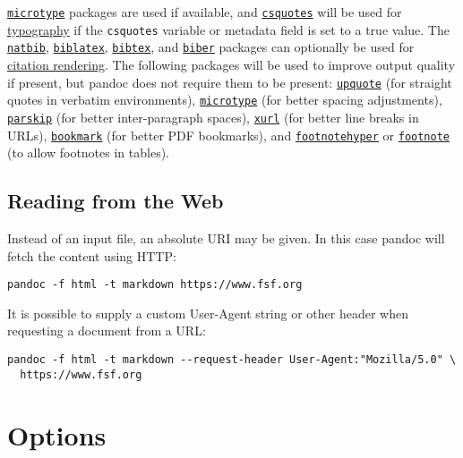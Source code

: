 \documentclass[
]{article}
\begin{document}
\href{https://ctan.org/pkg/microtype}{\texttt{microtype}} packages are
used if available, and
\href{https://ctan.org/pkg/csquotes}{\texttt{csquotes}} will be used for
\hyperref[typography]{typography} if the \texttt{csquotes} variable or
metadata field is set to a true value. The
\href{https://ctan.org/pkg/natbib}{\texttt{natbib}},
\href{https://ctan.org/pkg/biblatex}{\texttt{biblatex}},
\href{https://ctan.org/pkg/bibtex}{\texttt{bibtex}}, and
\href{https://ctan.org/pkg/biber}{\texttt{biber}} packages can
optionally be used for \hyperref[citation-rendering]{citation
rendering}. The following packages will be used to improve output
quality if present, but pandoc does not require them to be present:
\href{https://ctan.org/pkg/upquote}{\texttt{upquote}} (for straight
quotes in verbatim environments),
\href{https://ctan.org/pkg/microtype}{\texttt{microtype}} (for better
spacing adjustments),
\href{https://ctan.org/pkg/parskip}{\texttt{parskip}} (for better
inter-paragraph spaces), \href{https://ctan.org/pkg/xurl}{\texttt{xurl}}
(for better line breaks in URLs),
\href{https://ctan.org/pkg/bookmark}{\texttt{bookmark}} (for better PDF
bookmarks), and
\href{https://ctan.org/pkg/footnotehyper}{\texttt{footnotehyper}} or
\href{https://ctan.org/pkg/footnote}{\texttt{footnote}} (to allow
footnotes in tables).

\subsection{Reading from the Web}\label{reading-from-the-web}

Instead of an input file, an absolute URI may be given. In this case
pandoc will fetch the content using HTTP:

\begin{verbatim}
pandoc -f html -t markdown https://www.fsf.org
\end{verbatim}

It is possible to supply a custom User-Agent string or other header when
requesting a document from a URL:

\begin{verbatim}
pandoc -f html -t markdown --request-header User-Agent:"Mozilla/5.0" \
  https://www.fsf.org
\end{verbatim}

\section{Options}\label{options}
\end{document}
